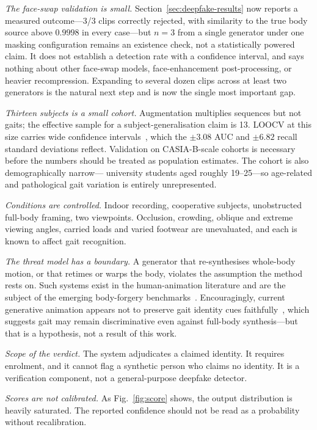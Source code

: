 \documentclass[journal]{IEEEtran}
\begin{document}
\emph{The face-swap validation is small.} Section~\ref{sec:deepfake-results}
now reports a measured outcome---3/3 clips correctly rejected, with similarity
to the true body source above $0.9998$ in every case---but $n=3$ from a single
generator under one masking configuration remains an existence check, not a
statistically powered claim. It does not establish a detection rate with a
confidence interval, and says nothing about other face-swap models,
face-enhancement post-processing, or heavier recompression. Expanding to
several dozen clips across at least two generators is the natural next step
and is now the single most important gap.

\emph{Thirteen subjects is a small cohort.} Augmentation multiplies sequences
but not gaits; the effective sample for a subject-generalisation claim is 13.
LOOCV at this size carries wide confidence intervals~\cite{varoquaux_small},
which the $\pm 3.08$ AUC and $\pm 6.82$ recall standard deviations reflect.
Validation on CASIA-B-scale cohorts is necessary before the numbers should be
treated as population estimates. The cohort is also demographically narrow---%
university students aged roughly 19--25---so age-related and pathological gait
variation is entirely unrepresented.

\emph{Conditions are controlled.} Indoor recording, cooperative subjects,
unobstructed full-body framing, two viewpoints. Occlusion, crowding, oblique
and extreme viewing angles, carried loads and varied footwear are unevaluated,
and each is known to affect gait recognition.

\emph{The threat model has a boundary.} A generator that re-synthesises whole-body
motion, or that retimes or warps the body, violates the assumption the method
rests on. Such systems exist in the human-animation literature and are the
subject of the emerging body-forgery benchmarks~\cite{ttdf,humanactionclips}.
Encouragingly, current generative animation appears not to preserve gait
identity cues faithfully~\cite{gaitfidelity}, which suggests gait may remain
discriminative even against full-body synthesis---but that is a hypothesis, not
a result of this work.

\emph{Scope of the verdict.} The system adjudicates a claimed identity. It
requires enrolment, and it cannot flag a synthetic person who claims no
identity. It is a verification component, not a general-purpose deepfake
detector.

\emph{Scores are not calibrated.} As Fig.~\ref{fig:score} shows, the output
distribution is heavily saturated. The reported confidence should not be read
as a probability without recalibration.
\end{document}
